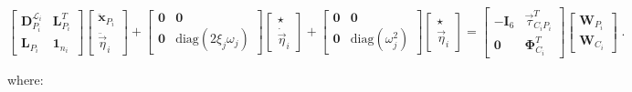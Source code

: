 \documentclass[smallcondensed]{svjour3}     %
\begin{document}
\begin{small}
	\begin{equation}\label{eq:2nd1}
	\left[\begin{array}{cc}\mathbf{D}^{\mathcal{L}_i}_{P_i} & \mathbf{L}_{P_i}^T\\ \mathbf{L}_{P_i} & \mathbf{1}_{n_i}\end{array}\right]\left[\begin{array}{c}\ddot{\mathbf{x}}_{P_i}\\ \ddot{\vec{\eta}}_i\end{array}\right]+\left[\begin{array}{cc} \mathbf{0}& \mathbf{0} \\  \mathbf{0} & \mbox{diag}(2\xi_j\omega_j)\end{array}\right]\left[\begin{array}{c}\star \\ \dot{\vec{\eta}}_i\end{array}\right]+\left[\begin{array}{cc} \mathbf{0}& \mathbf{0}\\  \mathbf{0}& \mbox{diag}(\omega_j^2)\end{array}\right]\left[\begin{array}{c}\star \\ \vec{\eta}_i\end{array}\right]=\left[\begin{array}{cc}-\mathbf{I}_6 & \vec{\tau}_{C_iP_i}^T\\ \mathbf{0} &  \mathbf{\Phi}_{C_i}^T \end{array}\right]\left[\begin{array}{c}\mathbf{W}_{P_i} \\ \mathbf{W}_{C_i}\end{array}\right]\;.
	\end{equation}
\end{small}
where:
\end{document}
